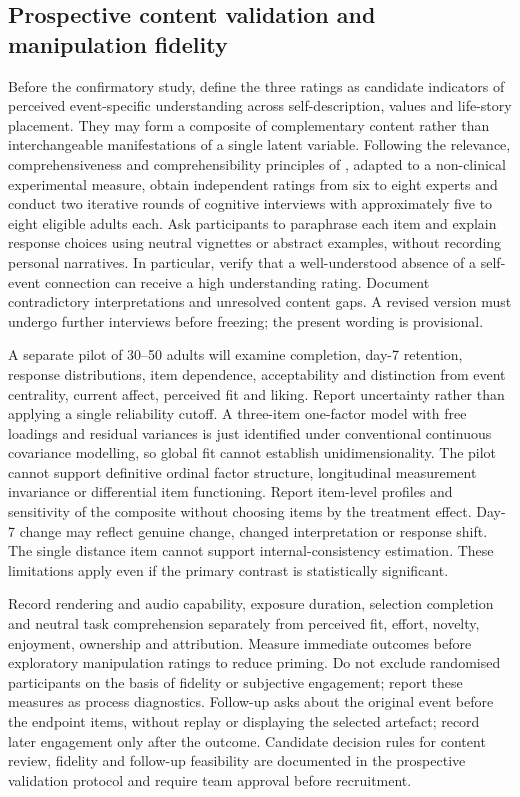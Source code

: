 \documentclass[11pt,a4paper]{article}
\begin{document}
\subsection{Prospective content validation and manipulation fidelity}
Before the confirmatory study, define the three ratings as candidate indicators of perceived event-specific understanding across self-description, values and life-story placement. They may form a composite of complementary content rather than interchangeable manifestations of a single latent variable. Following the relevance, comprehensiveness and comprehensibility principles of \citet{terwee2018}, adapted to a non-clinical experimental measure, obtain independent ratings from six to eight experts and conduct two iterative rounds of cognitive interviews with approximately five to eight eligible adults each. Ask participants to paraphrase each item and explain response choices using neutral vignettes or abstract examples, without recording personal narratives. In particular, verify that a well-understood absence of a self-event connection can receive a high understanding rating. Document contradictory interpretations and unresolved content gaps. A revised version must undergo further interviews before freezing; the present wording is provisional.
\par A separate pilot of 30--50 adults will examine completion, day-7 retention, response distributions, item dependence, acceptability and distinction from event centrality, current affect, perceived fit and liking. Report uncertainty rather than applying a single reliability cutoff. A three-item one-factor model with free loadings and residual variances is just identified under conventional continuous covariance modelling, so global fit cannot establish unidimensionality. The pilot cannot support definitive ordinal factor structure, longitudinal measurement invariance or differential item functioning. Report item-level profiles and sensitivity of the composite without choosing items by the treatment effect. Day-7 change may reflect genuine change, changed interpretation or response shift. The single distance item cannot support internal-consistency estimation. These limitations apply even if the primary contrast is statistically significant.
\par Record rendering and audio capability, exposure duration, selection completion and neutral task comprehension separately from perceived fit, effort, novelty, enjoyment, ownership and attribution. Measure immediate outcomes before exploratory manipulation ratings to reduce priming. Do not exclude randomised participants on the basis of fidelity or subjective engagement; report these measures as process diagnostics. Follow-up asks about the original event before the endpoint items, without replay or displaying the selected artefact; record later engagement only after the outcome. Candidate decision rules for content review, fidelity and follow-up feasibility are documented in the prospective validation protocol and require team approval before recruitment.
\end{document}
